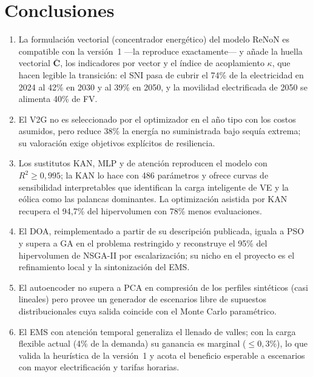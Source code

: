 \documentclass[11pt,a4paper]{article}
\newcommand{\vect}[1]{\bm{#1}}
\begin{document}
\section{Conclusiones}
\begin{enumerate}[leftmargin=1.6em]
  \item La formulaci\'on vectorial (concentrador energ\'etico) del modelo ReNoN es
  compatible con la versi\'on~1 ---la reproduce exactamente--- y a\~nade la huella
  vectorial $\bar{\vect{C}}$, los indicadores por vector y el \'indice de acoplamiento
  $\kappa$, que hacen legible la transici\'on: el SNI pasa de cubrir el 74\% de la
  electricidad en 2024 al 42\% en 2030 y al 39\% en 2050, y la movilidad electrificada de
  2050 se alimenta 40\% de FV.
  \item El V2G no es seleccionado por el optimizador en el a\~no tipo con los costos
  asumidos, pero reduce 38\% la energ\'ia no suministrada bajo sequ\'ia extrema; su
  valoraci\'on exige objetivos expl\'icitos de resiliencia.
  \item Los sustitutos KAN, MLP y de atenci\'on reproducen el modelo con $R^2\ge0{,}995$; la
  KAN lo hace con 486 par\'ametros y ofrece curvas de sensibilidad interpretables que
  identifican la carga inteligente de VE y la e\'olica como las palancas dominantes. La
  optimizaci\'on asistida por KAN recupera el 94,7\% del hipervolumen con 78\% menos
  evaluaciones.
  \item El DOA, reimplementado a partir de su descripci\'on publicada, iguala a PSO y
  supera a GA en el problema restringido y reconstruye el 95\% del hipervolumen de NSGA-II
  por escalarizaci\'on; su nicho en el proyecto es el refinamiento local y la
  sintonizaci\'on del EMS.
  \item El autoencoder no supera a PCA en compresi\'on de los perfiles sint\'eticos
  (casi lineales) pero provee un generador de escenarios libre de supuestos
  distribucionales cuya salida coincide con el Monte Carlo param\'etrico.
  \item El EMS con atenci\'on temporal generaliza el llenado de valles; con la carga
  flexible actual (4\% de la demanda) su ganancia es marginal ($\le0{,}3\%$), lo que
  valida la heur\'istica de la versi\'on~1 y acota el beneficio esperable a escenarios con
  mayor electrificaci\'on y tarifas horarias.
\end{enumerate}
\end{document}
